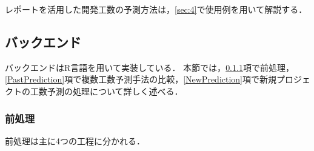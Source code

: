 レポートを活用した開発工数の予測方法は，\ref{sec:4}で使用例を用いて解説する．


\subsection{バックエンド}\label{subsec:3.2}
バックエンドはR言語を用いて実装している．
本節では，\ref{Preprocess}項で前処理，\ref{PastPrediction}項で複数工数予測手法の比較，\ref{NewPrediction}項で新規プロジェクトの工数予測の処理について詳しく述べる．
\subsubsection{前処理}\label{Preprocess}
前処理は主に4つの工程に分かれる．
